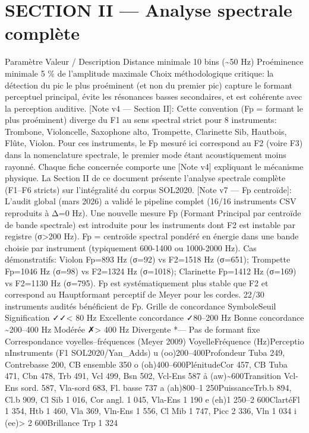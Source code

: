 \documentclass[11pt,a4paper]{article}
\begin{document}
\section*{SECTION II — Analyse spectrale complète}
Paramètre Valeur / Description Distance minimale 10 bins (\textasciitilde{}50 Hz) Proéminence minimale 5 \% de l'amplitude maximale Choix méthodologique critique: la détection du pic le plus proéminent (et non du premier pic) capture le formant perceptuel principal, évite les résonances basses secondaires, et est cohérente avec la perception auditive. [Note v4 — Section II]: Cette convention (Fp = formant le plus proéminent) diverge du F1 au sens spectral strict pour 8 instruments: Trombone, Violoncelle, Saxophone alto, Trompette, Clarinette Sib, Hautbois, Flûte, Violon. Pour ces instruments, le Fp mesuré ici correspond au F2 (voire F3) dans la nomenclature spectrale, le premier mode étant acoustiquement moins rayonné. Chaque fiche concernée comporte une [Note v4] expliquant le mécanisme physique. La Section II de ce document présente l'analyse spectrale complète (F1–F6 stricts) sur l'intégralité du corpus SOL2020. [Note v7 — Fp centroïde]: L'audit global (mars 2026) a validé le pipeline complet (16/16 instruments CSV reproduits à Δ=0 Hz). Une nouvelle mesure Fp (Formant Principal par centroïde de bande spectrale) est introduite pour les instruments dont F2 est instable par registre (σ>200 Hz). Fp = centroïde spectral pondéré en énergie dans une bande choisie par instrument (typiquement 600-1400 ou 1000-2000 Hz). Cas démonstratifs: Violon Fp=893 Hz (σ=92) vs F2=1518 Hz (σ=651); Trompette Fp=1046 Hz (σ=98) vs F2=1324 Hz (σ=1018); Clarinette Fp=1412 Hz (σ=169) vs F2=1130 Hz (σ=795). Fp est systématiquement plus stable que F2 et correspond au Hauptformant perceptif de Meyer pour les cordes. 22/30 instruments audités bénéficient de Fp. Grille de concordance SymboleSeuil Signification ✓✓< 80 Hz Excellente concordance ✓80–200 Hz Bonne concordance \textasciitilde{}200–400 Hz Modérée ✗> 400 Hz Divergente *— Pas de formant fixe Correspondance voyelles–fréquences (Meyer 2009) VoyelleFréquence (Hz)Perceptio nInstruments (F1 SOL2020/Yan\_Adds) u (oo)200–400Profondeur Tuba 249, Contrebasse 200, CB ensemble 350 o (oh)400–600PlénitudeCor 457, CB Tuba 471, Cbn 478, Trb 491, Vcl 499, Bsn 502, Vcl-Ens 587 å (aw)\textasciitilde{}600Transition Vcl-Ens sord. 587, Vla-sord 683, Fl. basse 737 a (ah)800–1 250PuissanceTrb.b 894, Cl.b 909, Cl Sib 1 016, Cor angl. 1 045, Vla-Ens 1 190 e (eh)1 250–2 600ClartéFl 1 354, Htb 1 460, Vla 369, Vln-Ens 1 556, Cl Mib 1 747, Picc 2 336, Vln 1 034 i (ee)> 2 600Brillance Trp 1 324
\par\medskip
\end{document}
